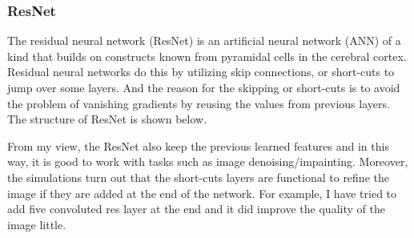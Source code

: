 \documentclass[letterpaper,10pt,english]{sphinxmanual}
\let\sphinxpxdimen\pdfpxdimen\else\newdimen\sphinxpxdimen
\begin{document}
\subsubsection{ResNet}
\label{\detokenize{usage/quickstart:resnet}}
The residual neural network (ResNet) is an artificial neural network (ANN) of a kind that builds on constructs known from pyramidal cells in the cerebral cortex. Residual neural networks do this by utilizing skip connections, or short-cuts to jump over some layers. And the reason for the skipping or short-cuts is to avoid the problem of vanishing gradients by reusing the values from previous layers. The structure of ResNet is shown below.

\noindent{\hspace*{\fill}\sphinxincludegraphics[width=150\sphinxpxdimen]{{800px-ResNets.svg}.png}\hspace*{\fill}}

From my view, the ResNet also keep the previous learned features and in this way, it is good to work with tasks such as image denoising/impainting. Moreover, the simulations turn out that the short-cuts layers are functional to refine the image if they are added at the end of the network. For example, I have tried to add five convoluted res layer at the end and it did improve the quality of the image little.
\end{document}

